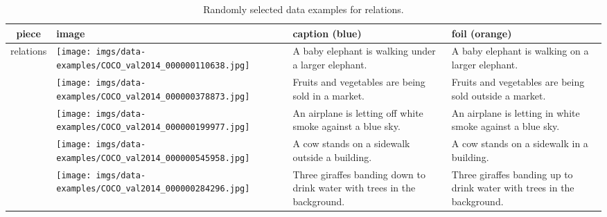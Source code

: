 \documentclass[11pt]{article}
\newcommand{\gr}[1]{\textcolor{niceblue}{#1}}
\newcommand\red[1]{\textcolor{niceorange}{#1}}
\begin{document}
\begin{table*}[t]
    \small
    \centering
    
\begin{tabular}{cp{.3\linewidth}b{.25\linewidth}b{.25\linewidth}}
      \toprule
    \bf piece & \bf image & \bf caption (\gr{blue}) & \bf foil (\red{orange}) \\
    \midrule
    \multirow{5}{*}{relations} & \texttt{[image: imgs/data-examples/COCO\_val2014\_000000110638.jpg]}
      & A baby elephant is walking \gr{under} a larger elephant. & A baby elephant is walking \red{on} a larger elephant. \\
      \cmidrule{2-4}
      & \texttt{[image: imgs/data-examples/COCO\_val2014\_000000378873.jpg]}
      & Fruits and vegetables are being sold \gr{in} a market. & Fruits and vegetables are being sold \red{outside} a market. \\
      \cmidrule{2-4}
      & \texttt{[image: imgs/data-examples/COCO\_val2014\_000000199977.jpg]}
      & An airplane is letting \gr{off} white smoke against a blue sky. & An airplane is letting \red{in} white smoke against a blue sky. \\
      \cmidrule{2-4}
      & \texttt{[image: imgs/data-examples/COCO\_val2014\_000000545958.jpg]}
      & A cow stands on a sidewalk \gr{outside} a building. & A cow stands on a sidewalk \red{in} a building. \\
      \cmidrule{2-4}
    & \texttt{[image: imgs/data-examples/COCO\_val2014\_000000284296.jpg]}
      & Three giraffes banding \gr{down} to drink water with trees in the background. & Three giraffes banding \red{up} to drink water with trees in the background. \\
      \bottomrule
    \end{tabular}
\caption{Randomly selected data examples for relations.}
    \label{tab:relations-examples}
\end{table*}
\end{document}
